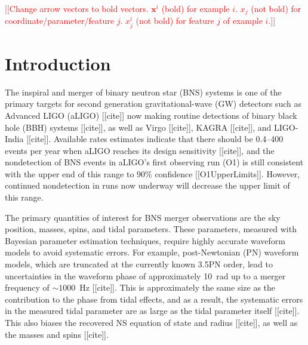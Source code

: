 \documentclass[prd,aps,letter,twocolumn,floatfix,notitlepage,nofootinbib]{revtex4-1}
\newcommand{\red}[1]{\textcolor{red}{#1}}
\begin{document}
\maketitle




\red{[[Change arrow vectors to bold vectors. ${\bm x}^i$ (bold) for example $i$. $x_j$ (not bold) for coordinate/parameter/feature $j$. 
$x_j^i$ (not bold) for feature $j$ of example $i$.]]}


\section{Introduction}

The inspiral and merger of binary neutron star (BNS) systems is one of the primary targets for second generation gravitational-wave (GW) detectors such as Advanced LIGO (aLIGO) [[cite]] now making routine detections of binary black hole (BBH) systems [[cite]], as well as Virgo [[cite]], KAGRA [[cite]], and LIGO-India [[cite]]. Available rates estimates indicate that there should be 0.4--400 events per year when aLIGO reaches its design sensitivity [[cite]], and the nondetection of BNS events in aLIGO's first observing run (O1) is still consistent with the upper end of this range to 90\% confidence [[O1UpperLimits]]. However, continued nondetection in runs now underway will decrease the upper limit of this range.

The primary quantities of interest for BNS merger observations are the sky position, masses, spins, and tidal parameters. These parameters, measured with Bayesian parameter estimation techniques, require highly accurate waveform models to avoid systematic errors. For example, post-Newtonian (PN) waveform models, which are truncated at the currently known 3.5PN order, lead to uncertainties in the waveform phase of approximately 10~rad up to a merger frequency of $\sim 1000$~Hz [[cite]]. This is approximately the same size as the contribution to the phase from tidal effects, and as a result, the systematic errors in the measured tidal parameter are as large as the tidal parameter itself [[cite]]. This also biases the recovered NS equation of state and radius [[cite]], as well as the masses and spins [[cite]].
\end{document}
